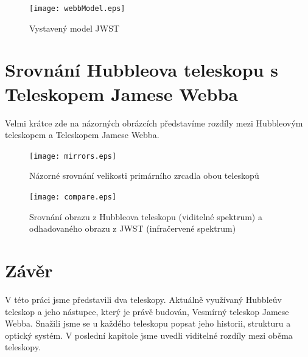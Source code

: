 \documentclass[a4paper,11pt]{article}
\begin{document}
\begin{figure}[h]
\begin{center}
\texttt{[image: webbModel.eps]}
\caption{Vystavený model JWST}
\end{center}
\end{figure}

\section{Srovnání Hubbleova teleskopu s Teleskopem Jamese Webba}
Velmi krátce zde na názorných obrázcích představíme rozdíly mezi Hubbleovým teleskopem a Teleskopem Jamese Webba.

\begin{figure}[h]
\begin{center}
\texttt{[image: mirrors.eps]}
\caption{Názorné srovnání velikosti primárního zrcadla obou teleskopů}
\end{center}
\end{figure}

\begin{figure}[h]
\begin{center}
\texttt{[image: compare.eps]}
\caption{Srovnání obrazu z Hubbleova teleskopu (viditelné spektrum) a odhadovaného obrazu z JWST (infračervené spektrum)}
\end{center}
\end{figure}

\section{Závěr}
V této práci jsme představili dva teleskopy. Aktuálně využívaný Hubbleův teleskop a jeho nástupce, který je právě budován, Vesmírný teleskop Jamese Webba. Snažili jsme se u každého teleskopu popsat jeho historii, strukturu a optický systém. V poslední kapitole jsme uvedli viditelné rozdíly mezi oběma teleskopy.
\newpage


\def\refname{Použitá literatura}

\end{document}
